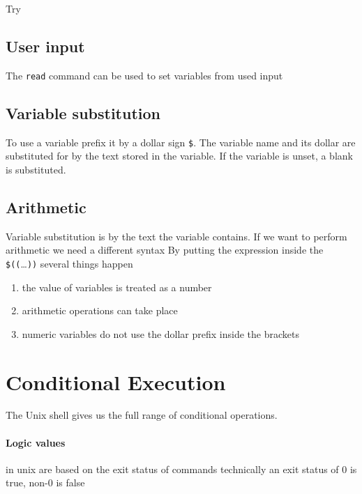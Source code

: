 \documentclass[a4paper]{article}
\begin{document}
Try

\subsection{User input}
The \texttt{read} command can be used to set variables from used input
\subsection{Variable substitution}
To use a variable prefix it by a dollar sign \texttt{\$}.  The
variable name and its dollar are substituted for by the text stored in
the variable.  If the variable is unset, a blank is substituted.

\subsection{Arithmetic}
Variable substitution is by the text the variable contains.  If we
want to perform arithmetic we need a different syntax
By putting the expression inside the \texttt{\$((}\ldots\texttt{))}
several things happen
\begin{enumerate}
\item the value of variables is treated as a number
\item arithmetic operations can take place
\item numeric variables do not use the dollar prefix inside the brackets
\end{enumerate}

\section{Conditional Execution}
The Unix shell gives us the full range of conditional operations.

\paragraph{Logic values} in unix are based on the exit status of
commands technically an exit status of 0 is true, non-0 is
  false
\end{document}
